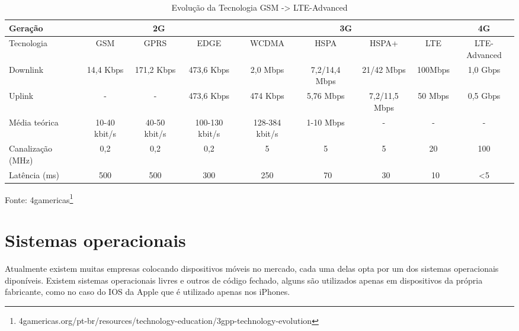 \begin{table}[!htb]
	\tiny
	\label{tab:LTE}
	\begin{tabular}{|l|*{8}{c|}}
		\hline \SPACE
		Geração & \multicolumn{3}{|c|}{2G}  & \multicolumn{4}{|c|}{3G}  & 4G\\ \hline \SPACE
		Tecnologia & GSM & GPRS & EDGE & WCDMA & HSPA & HSPA+ & LTE & LTE-Advanced\\ \hline \SPACE
		Downlink & 14,4 Kbps & 171,2 Kbps & 473,6 Kbps & 2,0 Mbps & 7,2/14,4 Mbps & 21/42 Mbps & 100Mbps & 1,0 Gbps\\ \hline \SPACE
		Uplink & - & - & 473,6 Kbps & 474 Kbps & 5,76 Mbps & 7,2/11,5 Mbps & 50 Mbps & 0,5 Gbps\\ \hline \SPACE
		Média teórica & 10-40 kbit/s & 40-50 kbit/s & 100-130 kbit/s & 128-384 kbit/s & 1-10 Mbps & - & - & -\\ \hline \SPACE
		Canalização (MHz) & 0,2 & 0,2 & 0,2 & 5 & 5 & 5 & 20 & 100\\ \hline \SPACE
		Latência (ms) & 500 & 500 & 300 & 250 & ~70 & ~30 & ~10 & <5\\ \hline
	\end{tabular}
	\caption[Evolução da Tecnologia GSM -> LTE-Advanced]{Evolução da Tecnologia GSM -> LTE-Advanced}
\end{table}%
\begin{center}
\small{Fonte: 4gamericas\footnote{4gamericas.org/pt-br/resources/technology-education/3gpp-technology-evolution}}
\end{center}

\section{Sistemas operacionais}
Atualmente existem muitas empresas colocando dispositivos móveis no mercado, cada uma delas opta por um dos sistemas operacionais diponíveis.
Existem sistemas operacionais livres e outros de código fechado, alguns são utilizados apenas em dispositivos da própria fabricante, como no caso do IOS da Apple que é utilizado apenas nos iPhones.

